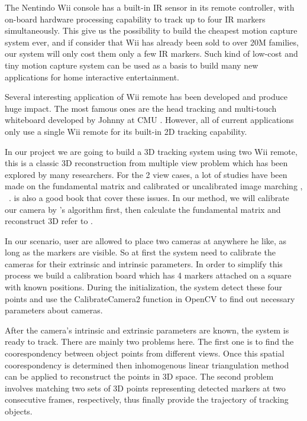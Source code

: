 \documentclass[10pt,twocolumn,letterpaper]{article}
\begin{document}
The Nentindo Wii console has a built-in IR sensor in its remote
controller, with on-board hardware processing capability to track
up to four IR markers simultaneously. This give us the possibility
to build the cheapest motion capture system ever, 
and if consider that Wii has
already been sold to over 20M families, 
our system will only cost them only a few IR markers. 
Such kind of low-cost and tiny motion capture system can be used as a basis 
to build many new applications for home interactive entertainment.

Several interesting application of Wii remote has been developed 
and produce huge impact. The most famous ones are the head tracking
and multi-touch whiteboard developed by Johnny at CMU\cite{JohnnyVR} \cite{JohnnyTouch}.
However, all of current applications only use a single Wii remote for 
its built-in 2D tracking capability.

In our project we are going to build a 3D tracking system using two Wii
remote, this is a classic 3D reconstruction from multiple view problem 
which has been explored by many researchers. For the 2 view cases, 
a lot of studies have been made on the fundamental 
matrix and calibrated or uncalibrated image marching
\cite{luong95},\cite{Higgins87} \cite{Zhang95}~\cite{Hartley95}. 
\cite{Hartley03} is also a good book that cover these issues. 
In our method, we will calibrate our camera by \cite{Zhang00}'s 
algorithm first, then calculate the fundamental matrix 
and reconstruct 3D refer to \cite{Faugeras92}.

In our scenario, user are allowed to place two cameras at anywhere he like,
as long as the markers are visible. So at first the system need to calibrate 
the cameras for their extrinsic and intrinsic parameters. In order
to simplify this process we build a calibration board which has 4 markers
attached on a square with known positions. During the initialization, 
the system detect 
these four points and use the CalibrateCamera2 function in OpenCV to find out 
necessary parameters about cameras.

After the camera's intrinsic and extrinsic parameters are known, the system
is ready to track. There are mainly two problems here. 
The first one is to find the coorespondency 
between object points from different views.
Once this spatial coorespondency is determined then 
inhomogenous linear triangulation method can be applied to reconstruct
the points in 3D space. The second problem involves
matching two sets of 3D points representing detected
markers at two consecutive frames, respectively, thus finally
provide the trajectory of tracking objects.
\end{document}
